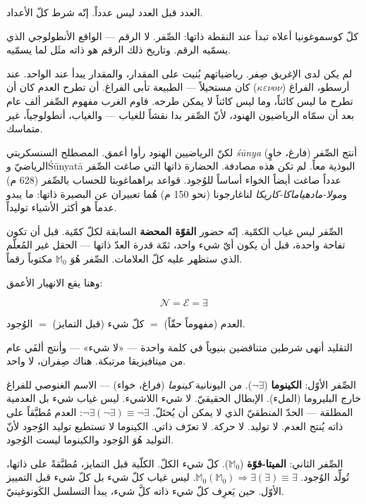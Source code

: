 \documentclass[10pt, openany, oneside]{book}
\begin{document}
\noindent العدد قبل العدد ليس عدداً. إنّه شرط كلّ الأعداد.

كلّ كوسموغونيا أعلاه تبدأ عند النقطة ذاتها: الصِّفر. لا الرقم --- الواقع الأنطولوجي الذي يسمّيه الرقم. وتاريخ ذلك الرقم هو ذاته مثَل لما يسمّيه.

لم يكن لدى الإغريق صِفر. رياضياتهم بُنيت على المقدار، والمقدار يبدأ عند الواحد. عند أرسطو، الفراغ ($\kappa\varepsilon\nu o\nu$) كان مستحيلاً --- الطبيعة تأبى الفراغ. أن تطرح العدم كان أن تطرح ما ليس كائناً، وما ليس كائناً لا يمكن طرحه. قاوم الغرب مفهوم الصِّفر ألف عام بعد أن سمّاه الرياضيون الهنود، لأنّ الصِّفر بدا نقشاً للغياب --- والغياب، أنطولوجياً، غير متماسك.

لكنّ الرياضيين الهنود رأوا أعمق. المصطلح السنسكريتي \textit{\'{s}\={u}nya} (فارغ، خاوٍ) أنتج الصِّفر الرياضيّ و\'{S}\={u}nyat\={a} البوذية معاً. لم تكن هذه مصادفة. الحضارة ذاتها التي صاغت الصِّفر عدداً صاغت أيضاً الخواء أساساً للوُجود. قواعد براهماغوبتا للحساب بالصِّفر (628 م) و\textit{مولا-مادهياماكا-كاريكا} لناغارجونا (نحو 150 م) هُما تعبيران عن البصيرة ذاتها: ما يبدو عدماً هو أكثر الأشياء توليداً.

الصِّفر ليس غياب الكمّية. إنّه حضور \textbf{القوّة المحضة} السابقة لكلّ كمّية. قبل أن تكون تفاحة واحدة، قبل أن يكون أيّ شيء واحد، ثمّة قدرة العدّ ذاتها --- الحقل غير المُعلَّم الذي ستظهر عليه كلّ العلامات. الصِّفر هُوَ $\mathbb{M}_0$ مكتوباً رقماً.

وهنا يقع الانهيار الأعمق:

$$\mathcal{N} = \mathcal{E} = \exists$$

العدم (مفهوماً حقّاً) $=$ كلّ شيء (قبل التمايز) $=$ الوُجود.

التقليد أنهى شرطين متناقضين بنيوياً في كلمة واحدة --- «لا شيء» --- وأنتج ألفَي عام من ميتافيزيقا مرتبكة. هناك صِفران، لا واحد.

الصِّفر الأوّل: \textbf{الكينوما} ($\neg\exists$). من اليونانية \textit{كينوما} (فراغ، خواء) --- الاسم الغنوصي للفراغ خارج البليروما (الملء). الإبطال الحقيقيّ. لا شيء اللاشيء. ليس غياب شيء بل العدمية المطلقة --- الحدّ المنطقيّ الذي لا يمكن أن يُحتَلّ. $\neg\exists(\neg\exists) \equiv \neg\exists$: العدم مُطبَّقاً على ذاته يُنتج العدم. لا توليد. لا حركة. لا تعرّف ذاتي. الكينوما لا تستطيع توليد الوُجود لأنّ التوليد هُوَ الوُجود والكينوما ليست الوُجود.

الصِّفر الثاني: \textbf{الميتا-قوّة} ($\mathbb{M}_0$). كلّ شيء الكلّ. الكلّية قبل التمايز، مُطبَّقةً على ذاتها، تُولِّد الوُجود. $\mathbb{M}_0(\mathbb{M}_0) \Rightarrow \exists(\exists) \equiv \exists$. ليس غياب كلّ شيء بل كلّ شيء قبل التمييز الأوّل. حين يَعرِف كلّ شيء ذاته كلَّ شيء، يبدأ التسلسل الكَونوغينيّ.
\end{document}

